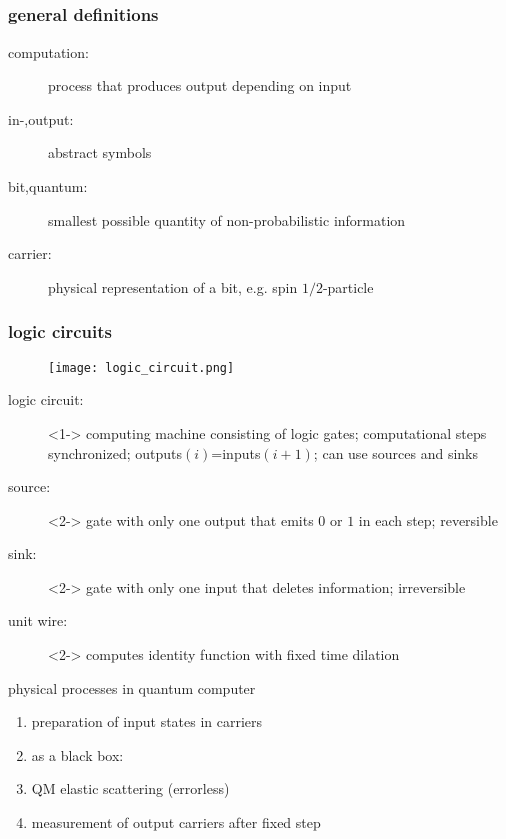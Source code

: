 \documentclass{beamer}
\begin{document}
\subsection[logic circuits]{}
\begin{frame}
	\frametitle{general definitions}
	\begin{description}
		\item[computation:] process that produces output depending on input
		\item[in-,output:] abstract symbols
		\item[bit,quantum:] smallest possible quantity of non-probabilistic information
		\item[carrier:] physical representation of a bit, e.g. spin $1/2$-particle
	\end{description}
\end{frame}
%
\begin{frame}
	\frametitle{logic circuits}
	\begin{figure}
		\centering
		\texttt{[image: logic\_circuit.png]}
	\end{figure}
	\begin{description}
		\item[logic circuit:]<1-> computing machine consisting of logic gates; computational steps synchronized; outputs$(i)$=inputs$(i+1)$; can use sources and sinks
		\item[source:]<2-> gate with only one output that emits $0$ or $1$ in each step; reversible
		\item[sink:]<2-> gate with only one input that deletes information; irreversible
		\item[unit wire:]<2-> computes identity function with fixed time dilation
	\end{description}
\end{frame}
%
\begin{frame}
	\begin{block}{physical processes in quantum computer}
		\begin{enumerate}
			\item preparation of input states in carriers
			\item as a black box:
			\item QM elastic scattering (errorless)
			\item measurement of output carriers after fixed step
		\end{enumerate}
	\end{block}
\end{frame}
%
\end{document}

